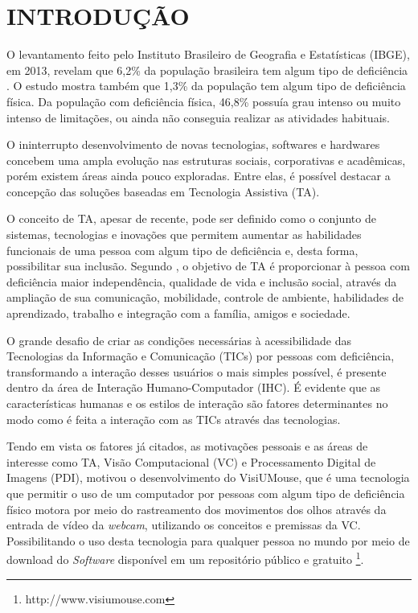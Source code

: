 \chapter{INTRODUÇÃO}\label{CAP:introducao}
O levantamento feito pelo Instituto Brasileiro de Geografia e Estatísticas (IBGE), em 2013, revelam que 6,2\% da população brasileira tem algum tipo de deficiência . O estudo mostra também que 1,3\% da população tem algum tipo de deficiência física. Da população com deficiência física, 46,8\% possuía grau intenso ou muito intenso de limitações, ou ainda não conseguia realizar as atividades habituais.

O ininterrupto desenvolvimento de novas tecnologias, softwares e hardwares concebem uma ampla evolução nas estruturas sociais, corporativas e acadêmicas, porém existem áreas ainda pouco exploradas. Entre elas, é possível destacar a concepção das soluções baseadas em Tecnologia Assistiva (TA).

O conceito de TA, apesar de recente, pode ser definido como o conjunto de sistemas, tecnologias e inovações que permitem aumentar as habilidades funcionais de uma pessoa com algum tipo de deficiência e, desta forma, possibilitar sua inclusão. Segundo , o objetivo de TA é proporcionar à pessoa com deficiência maior independência, qualidade de vida e inclusão social, através da ampliação de sua comunicação, mobilidade, controle de ambiente, habilidades de aprendizado, trabalho e integração com a família, amigos e sociedade.

O grande desafio de criar as condições necessárias à acessibilidade das Tecnologias da Informação e Comunicação (TICs) por pessoas com deficiência, transformando a interação desses usuários o mais simples possível, é presente dentro da área de Interação Humano-Computador (IHC). É evidente que as características humanas e os estilos de interação são fatores determinantes no modo como é feita a interação com as TICs através das tecnologias.

Tendo em vista os fatores já citados, as motivações pessoais e as áreas de interesse como TA, Visão Computacional (VC) e Processamento Digital de Imagens (PDI), motivou o desenvolvimento do VisiUMouse, que é  uma tecnologia que permitir o uso de um computador  por pessoas com algum tipo de deficiência físico motora por meio do rastreamento dos movimentos dos olhos através da entrada de vídeo da \textit{webcam}, utilizando os conceitos e premissas da VC. Possibilitando o uso desta tecnologia para qualquer pessoa no mundo por meio de download do \textit{Software} disponível em um repositório público e gratuito \footnote{http://www.visiumouse.com}.

